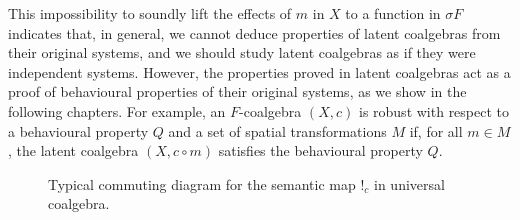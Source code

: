 {This impossibility to soundly lift the effects of $m$ in $X$ to a function in $\sigma F$ indicates that, in general, we cannot deduce properties of latent coalgebras from their original systems, and we should study latent coalgebras as if they were independent systems. However, the properties proved in latent coalgebras act as a proof of behavioural properties of their original systems, as we show in the following chapters. For example, an $F$-coalgebra $(X,c)$ is robust with respect to a behavioural property $Q$ and a set of spatial transformations $M$ if, for all $m\in M$, the latent coalgebra $(X,c\circ m)$ satisfies the behavioural property $Q$.

\begin{figure}[t]
\centering
{}
\caption{Typical commuting diagram for the semantic map $!_c$ in universal coalgebra.}
\label{fig:SemanticsMap} 
\end{figure}

}
